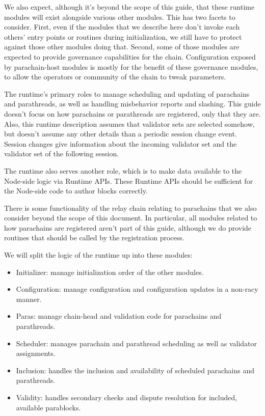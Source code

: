 We also expect, although it's beyond the scope of this guide, that these runtime
modules will exist alongside various other modules. This has two facets to
consider. First, even if the modules that we describe here don't invoke each
others' entry points or routines during initialization, we still have to protect
against those other modules doing that. Second, some of those modules are
expected to provide governance capabilities for the chain. Configuration exposed
by parachain-host modules is mostly for the benefit of these governance modules,
to allow the operators or community of the chain to tweak parameters.
\newline

The runtime's primary roles to manage scheduling and updating of parachains and
parathreads, as well as handling misbehavior reports and slashing. This guide
doesn't focus on how parachains or parathreads are registered, only that they
are. Also, this runtime description assumes that validator sets are selected
somehow, but doesn't assume any other details than a periodic session change
event. Session changes give information about the incoming validator set and the
validator set of the following session.
\newline

The runtime also serves another role, which is to make data available to the
Node-side logic via Runtime APIs. These Runtime APIs should be sufficient for
the Node-side code to author blocks correctly.
\newline

There is some functionality of the relay chain relating to parachains that we
also consider beyond the scope of this document. In particular, all modules
related to how parachains are registered aren't part of this guide, although we
do provide routines that should be called by the registration process.
\newline

We will split the logic of the runtime up into these modules:

\begin{itemize}
    \item Initializer: manage initialization order of the other modules.
    \item Configuration: manage configuration and configuration updates in a
    non-racy manner.
    \item Paras: manage chain-head and validation code for parachains and
    parathreads.
    \item Scheduler: manages parachain and parathread scheduling as well as
    validator assignments.
    \item Inclusion: handles the inclusion and availability of scheduled
    parachains and parathreads.
    \item Validity: handles secondary checks and dispute resolution for
    included, available parablocks.
\end{itemize}

